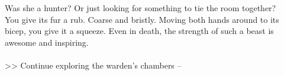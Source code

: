 Was she a hunter? Or just looking for something to tie the room together?\\

You give its fur a rub. Coarse and bristly. Moving both hands around to its bicep, you give it a squeeze. Even in death, the strength of such a beast is awesome and inspiring.\\
\\

>> Continue exploring the warden’s chambers -- 